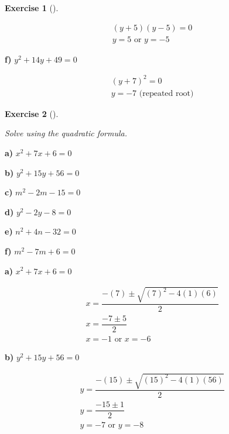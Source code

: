 \documentclass[
  letterpaper,
  DIV=11,
  numbers=noendperiod]{scrreprt}
\theoremstyle{definition}
\newtheorem{exercise}{Exercise}[chapter]
\theoremstyle{remark}
\begin{document}
\begin{exercise}[]
\begin{tcolorbox}
\begin{align*}
(y + 5)(y - 5) = 0 \\ y = 5 \text{ or } y = -5
\end{align*}

\textbf{f)} \(\displaystyle y^2 + 14y + 49 = 0\)

\begin{align*}
(y + 7)^2 = 0 \\ y = -7 \text{ (repeated root)}
\end{align*}

\end{tcolorbox}

\end{exercise}

\begin{exercise}[]\protect\hypertarget{exr-u6-11}{}\label{exr-u6-11}

\emph{Solve using the quadratic formula.}

\textbf{a)} \(\displaystyle x^2 + 7x + 6 = 0\)

\textbf{b)} \(\displaystyle y^2 + 15y + 56 = 0\)

\textbf{c)} \(\displaystyle m^2 - 2m - 15 = 0\)

\textbf{d)} \(\displaystyle y^2 - 2y - 8 = 0\)

\textbf{e)} \(\displaystyle n^2 + 4n - 32 = 0\)

\textbf{f)} \(\displaystyle m^2 - 7m + 6 = 0\)

\begin{tcolorbox}[enhanced jigsaw, opacitybacktitle=0.6, coltitle=black, arc=.35mm, colframe=quarto-callout-tip-color-frame, colback=white, bottomrule=.15mm, left=2mm, colbacktitle=quarto-callout-tip-color!10!white, titlerule=0mm, opacityback=0, title=\textcolor{quarto-callout-tip-color}{\faLightbulb}\hspace{0.5em}{🔍 View Solutions}, leftrule=.75mm, breakable, rightrule=.15mm, bottomtitle=1mm, toptitle=1mm, toprule=.15mm]

\textbf{a)} \(\displaystyle x^2 + 7x + 6 = 0\)

\begin{align*}
x = \dfrac{-(7) \pm \sqrt{(7)^2 - 4(1)(6)}}{2} \\ x = \dfrac{-7 \pm 5}{2} \\ x = -1 \text{ or } x = -6
\end{align*}

\textbf{b)} \(\displaystyle y^2 + 15y + 56 = 0\)

\begin{align*}
y = \dfrac{-(15) \pm \sqrt{(15)^2 - 4(1)(56)}}{2} \\ y = \dfrac{-15 \pm 1}{2} \\ y = -7 \text{ or } y = -8
\end{align*}


\end{tcolorbox}
\end{exercise}
\end{document}
